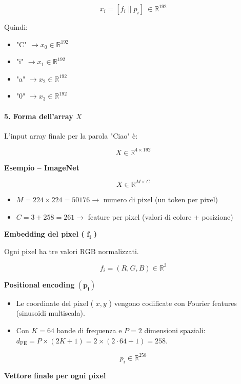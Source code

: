 \documentclass[
  11pt,
]{article}
\begin{document}
\[x_{i} = \left\lbrack f_{i}\| p_{i} \right\rbrack\  \in \mathbb{R}^{192}\]

Quindi:

\begin{itemize}
\item
  "C" \(\rightarrow x_{0} \in \mathbb{R}^{192}\)
\item
  "i" \(\rightarrow x_{1} \in \mathbb{R}^{192}\)
\item
  "a" \(\rightarrow x_{2} \in \mathbb{R}^{192}\)
\item
  "0" \(\rightarrow x_{3} \in \mathbb{R}^{192}\)
\end{itemize}

\paragraph{5. Forma dell'array $X$}

L'input array finale per la parola "Ciao" è:

\[X \in \mathbb{R}^{4 \times 192}\]

\textbf{Esempio -- ImageNet}

\[X \in \mathbb{R}^{M \times C}\]

\begin{itemize}
\item
  \(M = 224 \times 224 = 50176 \rightarrow\) numero di pixel (un token
  per pixel)
\item
  \(C = 3 + 258 = 261 \rightarrow\) feature per pixel (valori di colore
  + posizione)
\end{itemize}

\textbf{Embedding del pixel (} \(\mathbf{f}_{\mathbf{i}}\) \textbf{)}

Ogni pixel ha tre valori RGB normalizzati.

\[f_{i} = (R,G,B) \in \mathbb{R}^{3}\]

\textbf{Positional encoding} \(\left( \mathbf{p}_{\mathbf{i}} \right)\)

\begin{itemize}
\item
  Le coordinate del pixel ( \(x,y\) ) vengono codificate con Fourier
  features (sinusoidi multiscala).
\item
  Con \(K=64\) bande di frequenza e \(P=2\) dimensioni spaziali: \(d_{\text{PE}} = P \times (2K+1) = 2 \times (2 \cdot 64 + 1) = 258\).
\end{itemize}

\[p_{i} \in \mathbb{R}^{258}\]

\textbf{Vettore finale per ogni pixel}
\end{document}
